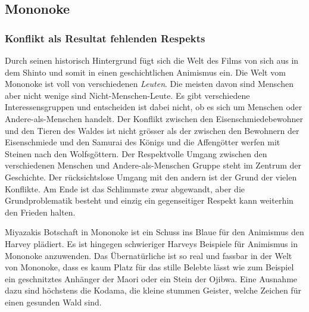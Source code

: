 

\subsection{Mononoke}
\subsubsection{Konflikt als Resultat fehlenden Respekts}
Durch seinen historisch Hintergrund fügt sich die Welt des Films von sich aus in dem Shinto und somit in einen geschichtlichen Animismus ein. Die Welt vom Mononoke ist voll von verschiedenen \emph{Leuten}. Die meisten davon sind Menschen aber nicht wenige sind Nicht-Menschen-Leute. Es gibt verschiedene Interessensgruppen und entscheiden ist dabei nicht, ob es sich um Menschen oder Andere-als-Menschen handelt. Der Konflikt zwischen den Eisenschmiedebewohner und den Tieren des Waldes ist nicht grösser als der zwischen den Bewohnern der Eisenschmiede und den Samurai des Königs und die Affengötter werfen mit Steinen nach den Wolfsgöttern. Der Respektvolle Umgang zwischen den verschiedenen Menschen und Andere-als-Menschen Gruppe steht im Zentrum der Geschichte. Der rücksichtslose Umgang mit den andern ist der Grund der vielen Konflikte. Am Ende ist das Schlimmste zwar abgewandt, aber die Grundproblematik besteht und einzig ein gegenseitiger Respekt kann weiterhin den Frieden halten.

Miyazakis Botschaft in Mononoke ist ein Schuss ins Blaue für den Animismus den Harvey plädiert. Es ist hingegen schwieriger Harveys Beispiele für Animismus in Mononoke anzuwenden. Das Übernatürliche ist so real und fassbar in der Welt von Mononoke, dass es kaum Platz für das stille Belebte lässt wie zum Beispiel ein geschnitztes Anhänger der Maori oder ein Stein der Ojibwa. Eine Ausnahme dazu sind höchstens die Kodama, die kleine stummen Geister, welche Zeichen für einen gesunden Wald sind. 

